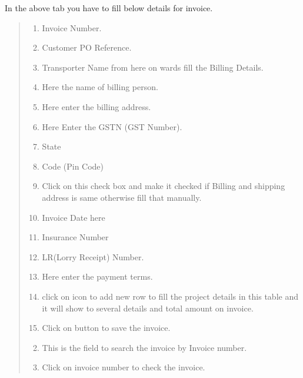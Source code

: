 \documentclass[letterpaper,10pt,english]{sphinxmanual}
\begin{document}
In the above tab you have to fill below details for invoice.
\begin{quote}
\begin{enumerate}
\item {} 
Invoice Number.

\item {} 
Customer PO Reference.

\item {} 
Transporter Name from here on wards fill the Billing Details.

\item {} 
Here the name of billing person.

\item {} 
Here enter the billing address.

\item {} 
Here Enter the GSTN (GST Number).

\item {} 
State

\item {} 
Code (Pin Code)

\item {} 
Click on this check box and make it checked if Billing and shipping address is same otherwise fill that manually.

\item {} 
Invoice Date here

\item {} 
Insurance Number

\item {} 
LR(Lorry Receipt) Number.

\item {} 
Here enter the payment terms.

\item {} 
click on \sphinxstylestrong{+} icon to add new row to fill the project details in this table and it will show to several details and total amount on invoice.

\item {} 
Click on  button to save the invoice.

\end{enumerate}
\begin{enumerate}
\setcounter{enumi}{1}
\item {} 
This is the  field to search the invoice by Invoice number.

\item {} 
Click on invoice number to check the invoice.

\end{enumerate}
\end{quote}
\end{document}
